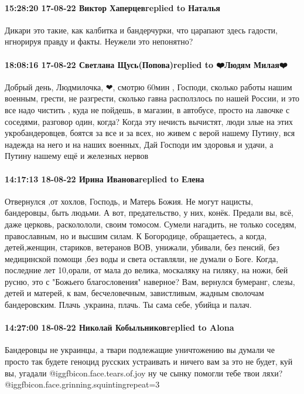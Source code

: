 \paragraph{15:28:20 17-08-22 Виктор Хаперцевreplied to Наталья}

Дикари это такие, как калбитка и бандерчурки, что царапают здесь гадости, нгнорируя правду и факты.
Неужели это непонятно?

\paragraph{18:08:16 17-08-22 Светлана Щусь(Попова)replied to ❤️Людям Милая❤️}

Добрый день, Людмилочка, ❤, смотрю 60мин , Господи, сколько работы нашим
военным, грести, не разгрести, сколько гавна расползлось по нашей России, и это
все надо чистить , куда не пойдешь, в магазин, в автобусе, просто на лавочке с
соседями, разговор один, когда? Когда эту нечисть вычистят, люди злые на этих
укробандеровцев, боятся за все и за всех, но живем с верой нашему Путину, вся
надежда на него и на наших военных, Дай Господи им здоровья и удачи, а Путину
нашему ещё и железных нервов

\paragraph{14:17:13 18-08-22 Ирина Ивановаreplied to Елена}

Отвернулся ,от хохлов, Господь, и Матерь Божия. Не могут нацисты, бандеровцы,
быть людьми. А вот, предательство, у них, конёк. Предали вы, всё, даже церковь,
расколололи, своим томосом. Сумели нагадить, не только соседям, православным,
но и высшим силам. К Богородице, обращаетесь, а когда, детей,женщин, стариков,
ветеранов ВОВ, унижали, убивали, без пенсий, без медицинской помощи ,без воды и
света оставляли, не думали о Боге. Когда, последние лет 10,орали, от мала до
велика, москаляку на гиляку, на ножи, бей русню, это с "Божьего благословения"
наверное? Вам, вернулся бумеранг, слезы, детей и матерей, к вам, бесчеловечным,
завистливым, жадным сволочам бандеровским. Плачь ,украина, плачь. Ты сама себе,
убийца и палач.

\paragraph{14:27:00 18-08-22 Николай Кобыльниковreplied to Alona}

Бандеровцы не украинцы, а твари подлежащие уничтожению вы думали че просто так
будете геноцид русских устраивать и ничего вам за это не будет, куй вы,
угадали @igg{fbicon.face.tears.of.joy}  ну че сынку помогли тебе твои ляхи?  @igg{fbicon.face.grinning.squinting}{repeat=3} 
